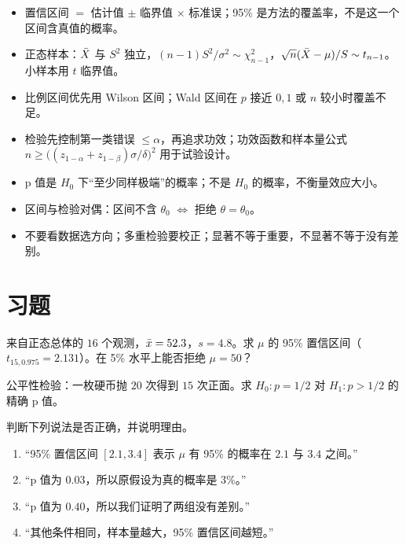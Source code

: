 \begin{summary}
\begin{itemize}
\item 置信区间 $=$ 估计值 $\pm$ 临界值 $\times$ 标准误；95\% 是方法的覆盖率，不是这一个区间含真值的概率。
\item 正态样本：$\bar{X}$ 与 $S^2$ 独立，$(n-1)S^2/\sigma^2\sim\chi^2_{n-1}$，$\sqrt n(\bar{X}-\mu)/S\sim t_{n-1}$。小样本用 $t$ 临界值。
\item 比例区间优先用 Wilson 区间；Wald 区间在 $p$ 接近 $0,1$ 或 $n$ 较小时覆盖不足。
\item 检验先控制第一类错误 $\le\alpha$，再追求功效；功效函数和样本量公式 $n\ge\big((z_{1-\alpha}+z_{1-\beta})\sigma/\delta\big)^2$ 用于试验设计。
\item p 值是 $H_0$ 下“至少同样极端”的概率；不是 $H_0$ 的概率，不衡量效应大小。
\item 区间与检验对偶：区间不含 $\theta_0$ $\iff$ 拒绝 $\theta=\theta_0$。
\item 不要看数据选方向；多重检验要校正；显著不等于重要，不显著不等于没有差别。
\end{itemize}
\end{summary}

\section*{习题}

\levelA
\begin{exercise}
来自正态总体的 $16$ 个观测，$\bar{x}=52.3$，$s=4.8$。求 $\mu$ 的 95\% 置信区间（$t_{15,0.975}=2.131$）。在 5\% 水平上能否拒绝 $\mu=50$？
\end{exercise}

\begin{exercise}
公平性检验：一枚硬币抛 $20$ 次得到 $15$ 次正面。求 $H_0:p=1/2$ 对 $H_1:p>1/2$ 的精确 p 值。
\end{exercise}

\begin{exercise}
判断下列说法是否正确，并说明理由。
\begin{enumerate}
\item “95\% 置信区间 $[2.1,3.4]$ 表示 $\mu$ 有 95\% 的概率在 $2.1$ 与 $3.4$ 之间。”
\item “p 值为 $0.03$，所以原假设为真的概率是 $3\%$。”
\item “p 值为 $0.40$，所以我们证明了两组没有差别。”
\item “其他条件相同，样本量越大，95\% 置信区间越短。”
\end{enumerate}
\end{exercise}

